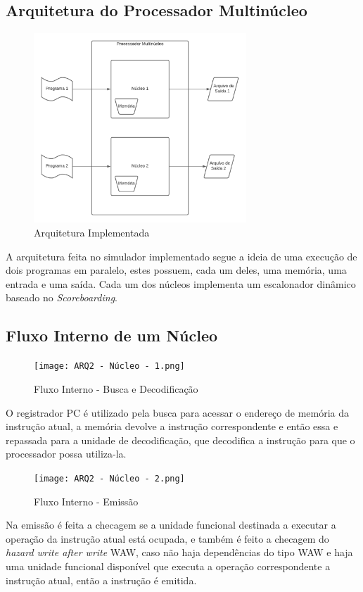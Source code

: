 \documentclass[journal]{IEEEtran}
\begin{document}
\subsection{Arquitetura do Processador Multinúcleo}
\begin{figure}[H]
\caption{Arquitetura Implementada}
\centering
\includegraphics[width=8cm]{ARQ2 - Processador.png}
\end{figure}

A arquitetura feita no simulador implementado segue a ideia de uma execução de dois programas em paralelo, estes possuem, cada um deles, uma memória, uma entrada e uma saída. Cada um dos núcleos implementa um escalonador dinâmico baseado no \textit{Scoreboarding}.

\subsection{Fluxo Interno de um Núcleo}
\begin{figure}[H]
\caption{Fluxo Interno - Busca e Decodificação}
\centering
\texttt{[image: ARQ2 - Núcleo - 1.png]}
\end{figure}

O registrador PC é utilizado pela busca para acessar o endereço de memória da instrução atual, a memória devolve a instrução correspondente e então essa e repassada para a unidade de decodificação, que decodifica a instrução para que o processador possa utiliza-la.

\begin{figure}[H]
\caption{Fluxo Interno - Emissão}
\centering
\texttt{[image: ARQ2 - Núcleo - 2.png]}
\end{figure}

Na emissão é feita a checagem se a unidade funcional destinada a executar a operação da instrução atual está ocupada, e também é feito a checagem do \textit{hazard write after write} WAW, caso não haja dependências do tipo WAW e haja uma unidade funcional disponível que executa a operação correspondente a instrução atual, então a instrução é emitida.
\end{document}
